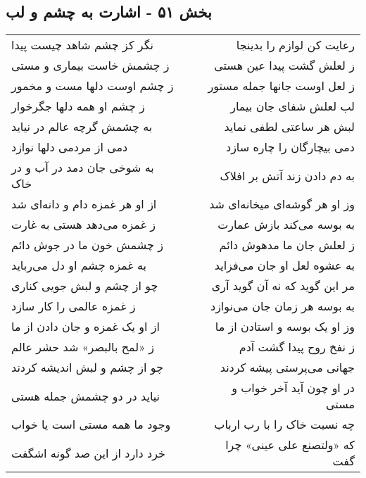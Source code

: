 \begin{center}
\section*{بخش ۵۱ - اشارت به چشم و لب}
\label{sec:sh051}
\begin{longtable}{l p{0.5cm} r}
نگر کز چشم شاهد چیست پیدا
&&
رعایت کن لوازم را بدینجا
\\
ز چشمش خاست بیماری و مستی
&&
ز لعلش گشت پیدا عین هستی
\\
ز چشم اوست دلها مست و مخمور
&&
ز لعل اوست جانها جمله مستور
\\
ز چشم او همه دلها جگرخوار
&&
لب لعلش شفای جان بیمار
\\
به چشمش گرچه عالم در نیاید
&&
لبش هر ساعتی لطفی نماید
\\
دمی از مردمی دلها نوازد
&&
دمی بیچارگان را چاره سازد
\\
به شوخی جان دمد در آب و در خاک
&&
به دم دادن زند آتش بر افلاک
\\
از او هر غمزه دام و دانه‌ای شد
&&
وز او هر گوشه‌ای میخانه‌ای شد
\\
ز غمزه می‌دهد هستی به غارت
&&
به بوسه می‌کند بازش عمارت
\\
ز چشمش خون ما در جوش دائم
&&
ز لعلش جان ما مدهوش دائم
\\
به غمزه چشم او دل می‌رباید
&&
به عشوه لعل او جان می‌فزاید
\\
چو از چشم و لبش جویی کناری
&&
مر این گوید که نه آن گوید آری
\\
ز غمزه عالمی را کار سازد
&&
به بوسه هر زمان جان می‌نوازد
\\
از او یک غمزه و جان دادن از ما
&&
وز او یک بوسه و استادن از ما
\\
ز «لمح بالبصر» شد حشر عالم
&&
ز نفخ روح پیدا گشت آدم
\\
چو از چشم و لبش اندیشه کردند
&&
جهانی می‌پرستی پیشه کردند
\\
نیاید در دو چشمش جمله هستی
&&
در او چون آید آخر خواب و مستی
\\
وجود ما همه مستی است یا خواب
&&
چه نسبت خاک را با رب ارباب
\\
خرد دارد از این صد گونه اشگفت
&&
که «ولتصنع علی عینی» چرا گفت
\\
\end{longtable}
\end{center}
